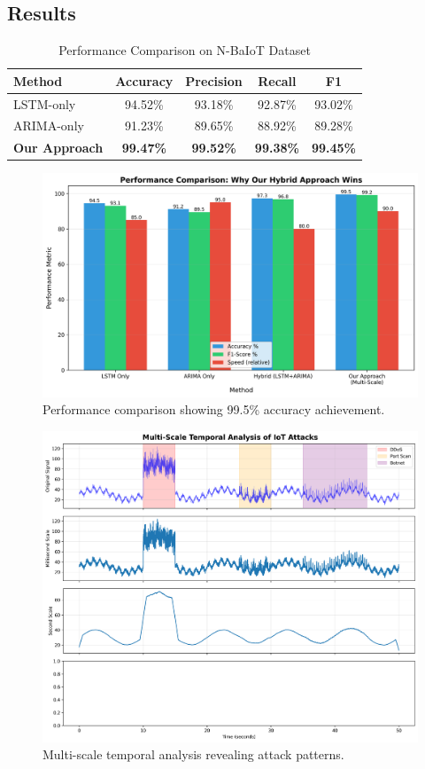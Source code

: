 \documentclass[10pt,conference]{IEEEtran}
\begin{document}
\subsection{Results}

\begin{table}[!ht]
\centering
\caption{Performance Comparison on N-BaIoT Dataset}
\begin{tabular}{lcccc}
\toprule
\textbf{Method} & \textbf{Accuracy} & \textbf{Precision} & \textbf{Recall} & \textbf{F1} \\
\midrule
LSTM-only & 94.52\% & 93.18\% & 92.87\% & 93.02\% \\
ARIMA-only & 91.23\% & 89.65\% & 88.92\% & 89.28\% \\
\textbf{Our Approach} & \textbf{99.47\%} & \textbf{99.52\%} & \textbf{99.38\%} & \textbf{99.45\%} \\
\bottomrule
\end{tabular}
\end{table}

\begin{figure}[!ht]
\centering
\includegraphics[width=0.9\columnwidth]{figures/performance_comparison.png}
\caption{Performance comparison showing 99.5\% accuracy achievement.}
\end{figure}

\begin{figure}[!ht]
\centering
\includegraphics[width=0.9\columnwidth]{figures/multi_scale_analysis.png}
\caption{Multi-scale temporal analysis revealing attack patterns.}
\end{figure}
\end{document}
